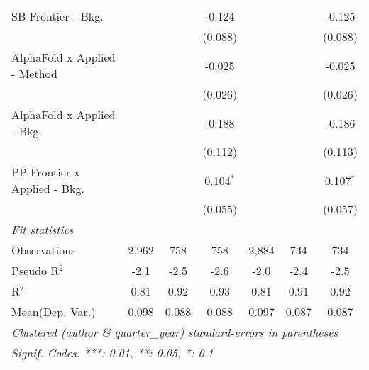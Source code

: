 \begin{tabular}{lcccccc}
   SB Frontier - Bkg.           &               &         & -0.124      &               &         & -0.125\\   
                                &               &         & (0.088)     &               &         & (0.088)\\   
   AlphaFold x Applied - Method &               &         & -0.025      &               &         & -0.025\\   
                                &               &         & (0.026)     &               &         & (0.026)\\   
   AlphaFold x Applied - Bkg.   &               &         & -0.188      &               &         & -0.186\\   
                                &               &         & (0.112)     &               &         & (0.113)\\   
   PP Frontier x Applied - Bkg. &               &         & 0.104$^{*}$ &               &         & 0.107$^{*}$\\   
                                &               &         & (0.055)     &               &         & (0.057)\\   
   \midrule
   \emph{Fit statistics}\\
   Observations                 & 2,962         & 758     & 758         & 2,884         & 734     & 734\\  
   Pseudo R$^2$                 & -2.1          & -2.5    & -2.6        & -2.0          & -2.4    & -2.5\\  
   R$^2$                        & 0.81          & 0.92    & 0.93        & 0.81          & 0.91    & 0.92\\  
Mean(Dep. Var.) & 0.098 & 0.088 & 0.088 & 0.097 & 0.087 & 0.087 \\
   \midrule \midrule
   \multicolumn{7}{l}{\emph{Clustered (author \& quarter\_year) standard-errors in parentheses}}\\
   \multicolumn{7}{l}{\emph{Signif. Codes: ***: 0.01, **: 0.05, *: 0.1}}\\
\end{tabular}
\par\endgroup
